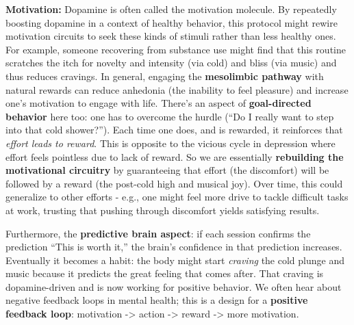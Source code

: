 \documentclass[11pt]{article}
\newcommand{\quotes}[1]{``#1''}
\begin{document}
\textbf{Motivation:} Dopamine is often called the motivation molecule. By repeatedly boosting dopamine in a context of healthy behavior, this protocol might rewire motivation circuits to seek these kinds of stimuli rather than less healthy ones. For example, someone recovering from substance use might find that this routine scratches the itch for novelty and intensity (via cold) and bliss (via music) and thus reduces cravings. In general, engaging the \textbf{mesolimbic pathway} with natural rewards can reduce anhedonia (the inability to feel pleasure) and increase one's motivation to engage with life. There's an aspect of \textbf{goal-directed behavior} here too: one has to overcome the hurdle (\quotes{Do I really want to step into that cold shower?}). Each time one does, and is rewarded, it reinforces that \textit{effort leads to reward}. This is opposite to the vicious cycle in depression where effort feels pointless due to lack of reward. So we are essentially \textbf{rebuilding the motivational circuitry} by guaranteeing that effort (the discomfort) will be followed by a reward (the post-cold high and musical joy). Over time, this could generalize to other efforts - e.g., one might feel more drive to tackle difficult tasks at work, trusting that pushing through discomfort yields satisfying results.

Furthermore, the \textbf{predictive brain aspect}: if each session confirms the prediction \quotes{This is worth it,} the brain's confidence in that prediction increases. Eventually it becomes a habit: the body might start \textit{craving} the cold plunge and music because it predicts the great feeling that comes after. That craving is dopamine-driven and is now working for positive behavior. We often hear about negative feedback loops in mental health; this is a design for a \textbf{positive feedback loop}: motivation -> action -> reward -> more motivation.
\end{document}
